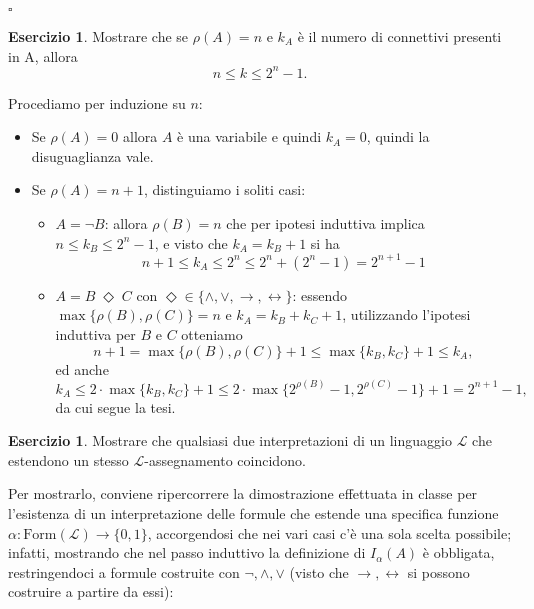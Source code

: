 \documentclass[a4paper]{article}
\newcommand{\limplies}{\rightarrow}
\newcommand{\liff}{\leftrightarrow}
\theoremstyle{definition}
\theoremstyle{definition}
\theoremstyle{remark}
\theoremstyle{definition}
\newtheorem{exercise}{Esercizio}[section]
\newtheorem*{exercise*}{Esercizio}
\begin{document}
\hfill\(\square\)
\begin{exercise}
	Mostrare che se \(\rho(A)=n\) e \(k_A\) è il numero di connettivi presenti in A, allora \[ n\leq k\leq 2^n -1.\]
\end{exercise}
Procediamo per induzione su \(n\):
\begin{itemize}
	\item Se \(\rho(A)=0\) allora \(A\) è una variabile e quindi \(k_A=0\), quindi la disuguaglianza vale.
	\item Se \(\rho(A)=n+1\), distinguiamo i soliti casi:
		\begin{itemize}
			\item \(A=\lnot B\): allora \(\rho(B)=n\) che per ipotesi induttiva implica \(n\leq k_B\leq 2^n-1\), e visto che \(k_A=k_B+1\) si ha \[n+1\leq k_A \leq
				2^n\leq 2^n + \left( 2^n - 1 \right) = 2^{n+1} - 1\]
			\item \(A=B\;\Diamond\;C\) con \(\Diamond\in\{\land,\lor,\limplies,\liff\}\): essendo \(\max\{\rho(B),\rho(C)\}=n\) e \(k_A=k_B+k_C+1\), utilizzando
				l'ipotesi induttiva per \(B\) e \(C\) otteniamo
				\[ n+1=\max\{\rho(B),\rho(C)\}+1\leq\max\{k_B,k_C\}+1\leq k_A,\]
				ed anche
				\[ k_A \leq 2\cdot\max\{k_B,k_C\}+1\leq 2\cdot\max\{2^{\rho(B)}-1,2^{\rho(C)}-1\}+1=2^{n+1}-1,\]
				da cui segue la tesi.
		\end{itemize}
\end{itemize}
\begin{exercise*}\label{unicità}
	Mostrare che qualsiasi due interpretazioni di un linguaggio \(\mathcal{L}\) che estendono un stesso $\mathcal{L}$-assegnamento coincidono.
\end{exercise*}
Per mostrarlo, conviene ripercorrere la dimostrazione effettuata in classe per l'esistenza di un interpretazione delle formule che estende una specifica
funzione \(\alpha:\text{Form}\left( \mathcal{L} \right) \to \{0,1\}\), accorgendosi che nei vari casi c'è una sola scelta
possibile; infatti, mostrando che nel passo induttivo la definizione di \(I_\alpha\left( A \right) \) è obbligata, restringendoci a formule costruite con \(
\lnot, \land, \lor\) (visto che \(\limplies,\liff\) si possono costruire a partire da essi):
\end{document}
